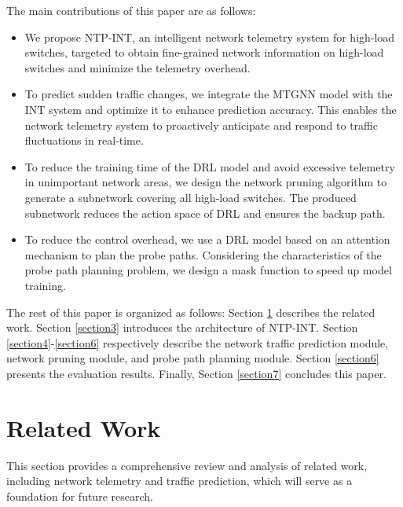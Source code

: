 \documentclass[journal]{IEEEtran}
\begin{document}
The main contributions of this paper are as follows:

\vspace{-0em}
\begin{itemize}
\item We propose NTP-INT, an intelligent network telemetry system for high-load switches, targeted to obtain fine-grained network information on high-load switches and minimize the telemetry overhead.
\item To predict sudden traffic changes, we integrate the MTGNN model with the INT system and optimize it to enhance prediction accuracy.  This enables the network telemetry system to proactively anticipate and respond to traffic fluctuations in real-time.
\item To reduce the training time of the DRL model and avoid excessive telemetry in unimportant network areas, we design the network pruning algorithm to generate a subnetwork covering all high-load switches. The produced subnetwork reduces the action space of DRL and ensures the backup path.
\item To reduce the control overhead, we use a DRL model based on an attention mechanism to plan the probe paths. Considering the characteristics of the probe path planning problem, we design a mask function to speed up model training.
\end{itemize}

The rest of this paper is organized as follows:  Section \ref{section2} describes the related work. Section \ref{section3} introduces the architecture of NTP-INT. Section \ref{section4}-\ref{section6} respectively describe the network traffic prediction module, network pruning module, and probe path planning module. Section \ref{section6} presents the evaluation results. Finally, Section \ref{section7} concludes this paper.



\section{Related Work}
\label{section2}
This section provides a comprehensive review and analysis of related work, including network telemetry and traffic prediction, which will serve as a foundation for future research.
\end{document}
